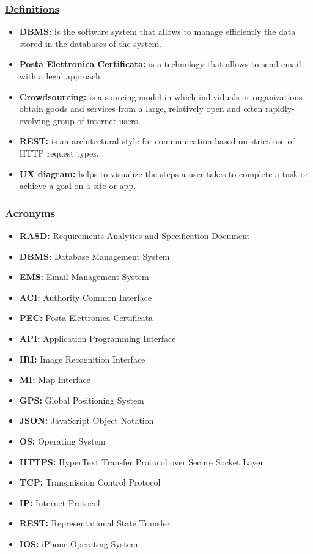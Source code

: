		\subsubsection[Definitions]{\hyperlink{toc}{Definitions}}
			\begin{itemize}
				\item \textbf{DBMS:} is the software system that allows to manage efficiently the data stored in the databases of the system.
				
				\item \textbf{Posta Elettronica Certificata:} is a technology that allows to send email with a legal approach.
				
				\item \textbf{Crowdsourcing:} is a sourcing model in which individuals or organizations obtain goods and services from a large, relatively open and often rapidly-evolving group of internet users.
				
				\item \textbf{REST:} is an architectural style for communication based on strict use of HTTP request types.
				
				\item \textbf{UX diagram:} helps to visualize the steps a user takes to complete a task or achieve a goal on a site or app.
			\end{itemize}
		
		\subsubsection[Acronyms]{\hyperlink{toc}{Acronyms}}
			\begin{itemize}
				\item \textbf{RASD:} Requirements Analytics and Specification Document
				\item \textbf{DBMS:} Database Management System
				\item \textbf{EMS:} Email Management System
				\item \textbf{ACI:} Authority Common Interface
				\item \textbf{PEC:} Posta Elettronica Certificata
				\item \textbf{API:} Application Programming Interface
				\item \textbf{IRI:} Image Recognition Interface
				\item \textbf{MI:} Map Interface
				\item \textbf{GPS:} Global Positioning System
				\item \textbf{JSON:} JavaScript Object Notation
				\item \textbf{OS:} Operating System
				\item \textbf{HTTPS:} HyperText Transfer Protocol over Secure Socket Layer
				\item \textbf{TCP:} Transmission Control Protocol
				\item \textbf{IP:} Internet Protocol
				\item \textbf{REST:} Representational State Transfer
				\item \textbf{IOS:} iPhone Operating System	
			\end{itemize}
			
